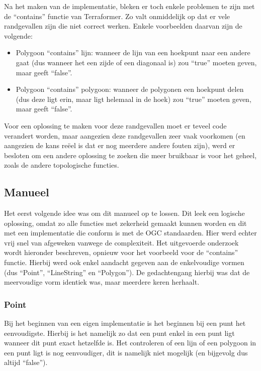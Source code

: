 Na het maken van de implementatie, bleken er toch enkele problemen te zijn met de ``contains'' functie van Terraformer. Zo valt onmiddelijk op dat er vele randgevallen zijn die niet correct werken. Enkele voorbeelden daarvan zijn de volgende:
\begin{itemize}
    \item Polygoon ``contains'' lijn: wanneer de lijn van een hoekpunt naar een andere gaat (dus wanneer het een zijde of een diagonaal is) zou ``true'' moeten geven, maar geeft ``false''.
    \item Polygoon ``contains'' polygoon: wanneer de polygonen een hoekpunt delen (dus deze ligt erin, maar ligt helemaal in de hoek) zou ``true'' moeten geven, maar geeft ``false''.
\end{itemize}

Voor een oplossing te maken voor deze randgevallen moet er teveel code verandert worden, maar aangezien deze randgevallen zeer vaak voorkomen (en aangezien de kans reëel is dat er nog meerdere andere fouten zijn), werd er besloten om een andere oplossing te zoeken die meer bruikbaar is voor het geheel, zoals de andere topologische functies.

\subsection{Manueel}
Het eerst volgende idee was om dit manueel op te lossen. Dit leek een logische oplossing, omdat zo alle functies met zekerheid gemaakt kunnen worden en dit met een implementatie die conform is met de OGC standaarden. Hier werd echter vrij snel van afgeweken vanwege de complexiteit. Het uitgevoerde onderzoek wordt hieronder beschreven, opnieuw voor het voorbeeld voor de ``contains'' functie. Hierbij werd ook enkel aandacht gegeven aan de enkelvoudige vormen (dus ``Point'', ``LineString'' en ``Polygon''). De gedachtengang hierbij was dat de meervoudige vorm identiek was, maar meerdere keren herhaalt.

\subsubsection{Point}
Bij het beginnen van een eigen implementatie is het beginnen bij een punt het eenvoudigste. Hierbij is het namelijk zo dat een punt enkel in een punt ligt wanneer dit punt exact hetzelfde is. Het controleren of een lijn of een polygoon in een punt ligt is nog eenvoudiger, dit is namelijk niet mogelijk (en bijgevolg dus altijd ``false'').  


